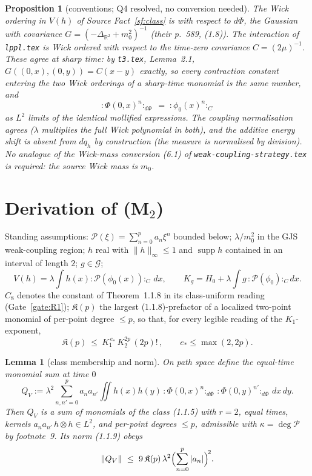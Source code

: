 \documentclass[11pt,a4paper]{article}
\theoremstyle{plain}
\newtheorem{proposition}[theorem]{Proposition}
\newtheorem{lemma}[theorem]{Lemma}
\theoremstyle{definition}
\newcommand{\R}{\mathbb{R}}
\newcommand{\G}{\mathcal{G}}
\DeclareMathOperator{\supp}{supp}
\begin{document}
\begin{proposition}[conventions; Q4 resolved, no conversion needed]\label{prop:conv}
The Wick ordering in $V(h)$ of Source Fact~\ref{sf:class} is with respect to $d\Phi$, the Gaussian
with covariance $G=(-\Delta_{\R^2}+m_0^2)^{-1}$ (their p.~589, (1.8)). The interaction of
\texttt{lppl.tex} is Wick ordered with respect to the time-zero covariance $C=(2\mu)^{-1}$. These
agree at sharp time: by \texttt{t3.tex}, Lemma~2.1, $G((0,x),(0,y))=C(x-y)$ \emph{exactly}, so
every contraction constant entering the two Wick orderings of a sharp-time monomial is the same
number, and
\[
  :\Phi(0,x)^n:_{d\Phi}\;=\;:\phi_0(x)^n:_{C}
\]
as $L^2$ limits of the identical mollified expressions. The coupling normalisation agrees
($\lambda$ multiplies the full Wick polynomial in both), and the additive energy shift is absent
from $dq_h$ by construction (the measure is normalised by division). No analogue of the Wick-mass
conversion (6.1) of \texttt{weak-coupling-strategy.tex} is required: the source Wick mass
\emph{is} $m_0$.
\end{proposition}

\section{Derivation of (M$_2$)}

Standing assumptions: $\mathscr P(\xi)=\sum_{n=0}^pa_n\xi^n$ bounded below; $\lambda/m_0^2$ in
the GJS weak-coupling region; $h$ real with $\|h\|_\infty\le1$ and $\supp h$ contained in an
interval of length $2$; $g\in\G$;
\[
  V(h)=\lambda\int h(x):\mathscr P(\phi_0(x)):_C\,dx,\qquad
  K_g=H_0+\lambda\int g\,:\mathscr P(\phi_0):_C dx .
\]
$C_8$ denotes the constant of Theorem~1.1.8 in its class-uniform reading (Gate~\ref{gate:R1});
$\mathfrak K(p)$ the largest (1.1.8)-prefactor of a localized two-point monomial of per-point
degree $\le p$, so that, for every legible reading of the $K_1$-exponent,
\[
  \mathfrak K(p)\ \le\ K_1^{\,e_*}\,K_2^{2p}\,(2p)!\,,\qquad e_*\le\max(2,2p).
\]

\begin{lemma}[class membership and norm]\label{lem:A}
On path space define the equal-time monomial sum at time $0$
\[
  Q_V:=\lambda^2\sum_{n,n'=0}^p a_na_{n'}\iint h(x)h(y)\,
  :\Phi(0,x)^n:_{d\Phi}\,:\Phi(0,y)^{n'}:_{d\Phi}\,dx\,dy .
\]
Then $Q_V$ is a sum of monomials of the class (1.1.5) with $r=2$, equal times, kernels
$a_na_{n'}\,h\otimes h\in L^2$, and per-point degrees $\le p$, admissible with
$\kappa=\deg\mathscr P$ by footnote~9. Its norm (1.1.9) obeys
\[
  \|Q_V\|\ \le\ 9\,\mathfrak K(p)\,\lambda^2\Bigl(\sum_{n=0}^p|a_n|\Bigr)^{\!2}.
\]
\end{lemma}
\end{document}
